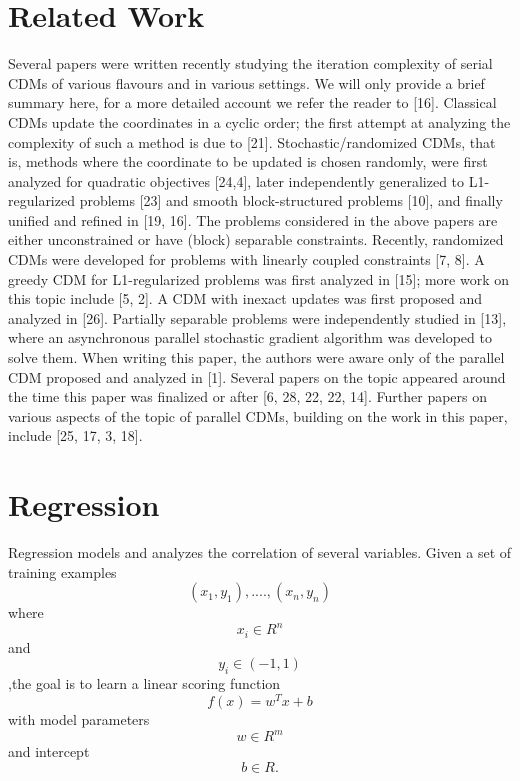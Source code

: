 \documentclass{sigplanconf}
\begin{document}
\section{Related Work}
Several papers were written recently studying the iteration complexity of serial CDMs of various flavours and in various settings. 
We will only provide a brief summary here, for a more detailed account we refer the reader to [16]. Classical CDMs update the coordinates in a cyclic order; 
the first attempt at analyzing the complexity of such a method is due to [21]. Stochastic/randomized CDMs, that is, methods where
the coordinate to be updated is chosen randomly, were first analyzed for quadratic objectives [24,4], later independently generalized to
L1-regularized problems [23] and smooth block-structured problems [10], and finally unified and refined in [19, 16]. 
The problems considered in the above papers are either unconstrained or have (block) separable constraints. Recently, randomized CDMs
were developed for problems with linearly coupled constraints [7, 8]. A greedy CDM for L1-regularized problems was 
first analyzed in [15]; more work on this topic include [5, 2]. A CDM with inexact updates was first proposed and analyzed in [26]. Partially
separable problems were independently studied in [13], where an asynchronous parallel stochastic
gradient algorithm was developed to solve them.
When writing this paper, the authors were aware only of the parallel CDM proposed and analyzed in [1]. Several papers on the 
topic appeared around the time this paper was finalized or after [6, 28, 22, 22, 14]. Further papers on various aspects of the 
topic of parallel CDMs, building on the work in this paper, include [25, 17, 3, 18].

\section{Regression}
\noindent
Regression models and analyzes the correlation of several variables. Given a set of training examples 
\begin{equation}(x_1,y_1),....,(x_n,y_n)\end{equation} where \begin{equation} x_i \in R^n \end{equation}
and \begin{equation} y_i \in (-1,1) \end{equation},the goal is to learn a linear scoring function
\begin{equation} f(x) = w^Tx + b \end{equation} with model parameters \begin{equation} w \in R^m \end{equation}
and intercept \begin{equation} b \in R. \end{equation}\\
\end{document}

